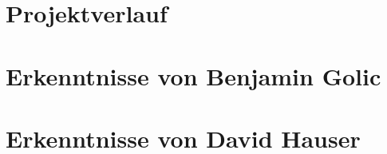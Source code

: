 \section{Projektverlauf}
\lipsum[5-12]

\section{Erkenntnisse von Benjamin Golic}
\lipsum[5-12]

\section{Erkenntnisse von David Hauser}
\lipsum[5-12]

